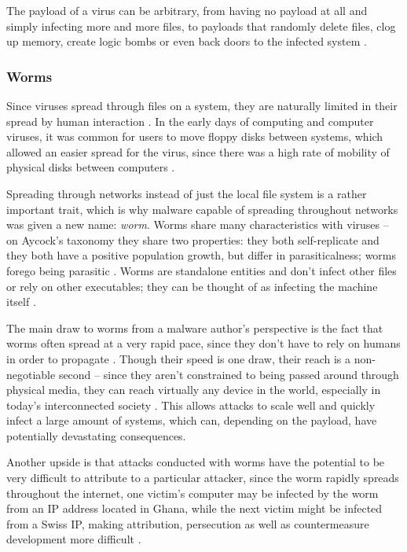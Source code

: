 The payload of a virus can be arbitrary, from having no payload at all and simply infecting more and more files, to
payloads that randomly delete files, clog up memory, create logic bombs or even back doors to the infected system 
\cite{viruses-revealed-book, skoudis-book, cohen-virus-course}. 

\subsubsection{Worms} \label{subsec:worms}
Since viruses spread through files on a system, they are naturally limited in their spread by human interaction
\cite{aycock-book}. In the early days of computing and computer viruses, it was common for users to move floppy
disks between systems, which allowed an easier spread for the virus, since there was a high rate of mobility of physical
disks between computers \cite{cohen-virus-course}. 

Spreading through networks instead of just the local file system is a rather important trait, which is why malware capable of
spreading throughout networks was given a new name: \emph{worm}. Worms share many characteristics with viruses -- on
Aycock's taxonomy they share two properties: they both self-replicate and they both have a positive population growth,
but differ in parasiticalness; worms forego being parasitic \cite[p.~15]{aycock-book}. Worms are standalone entities and
don't infect other files or rely on other executables; they can be thought of as infecting the machine itself \cite{
aycock-book, viruses-revealed-book}.

The main draw to worms from a malware author's perspective is the fact that worms often spread at a very rapid pace,
since they don't have to rely on humans in order to propagate \cite{aycock-book, skoudis-book, viruses-revealed-book}.
Though their speed is one draw, their reach is a non-negotiable second -- since they aren't constrained to being passed
around through physical media, they can reach virtually any device in the world, especially in today's interconnected
society \cite{skoudis-book, aycock-book}. This allows attacks to scale well and quickly infect a large amount of systems,
which can, depending on the payload, have potentially devastating consequences.

Another upside is that attacks conducted with worms have the potential to be very difficult to attribute to a particular
attacker, since the worm rapidly spreads throughout the internet, one victim's computer may be infected by the worm from
an IP address located in Ghana, while the next victim might be infected from a Swiss IP, making attribution, persecution
as well as countermeasure development more difficult \cite{skoudis-book}.

